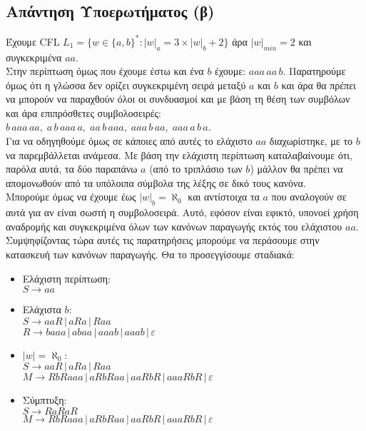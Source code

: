 \subsection{Απάντηση Υποερωτήματος (β)}
\label{ssec:Solution_1.2}
\doublespacing

Έχουμε CFL
$ L_1 = \{w \in \{a, b\}^* : |w|_a = 3 \times |w|_b + 2 \}$
άρα $\vert w \vert_{min} = 2$ και συγκεκριμένα $aa$.\\
Στην περίπτωση όμως που έχουμε έστω και ένα $b$ έχουμε:
$aaa\,aa\,b$.
Παρατηρούμε όμως ότι η γλώσσα δεν ορίζει συγκεκριμένη σειρά μεταξύ $a$ και
$b$ και άρα θα πρέπει να μπορούν να παραχθούν όλοι οι συνδυασμοί και με βάση τη θέση των συμβόλων και άρα
επιπρόσθετες συμβολοσειρές: $b\,aaa\,aa,\; a\,b\,aaa\,a,\; aa\,b\,aaa,\; aaa\,b\,aa,\;
aaa\,a\,b\,a$.\\
Για να οδηγηθούμε όμως σε κάποιες από αυτές το ελάχιστο $aa$ διαχωρίστηκε, με το $b$ να παρεμβάλλεται ανάμεσα.
Με βάση την ελάχιστη περίπτωση καταλαβαίνουμε ότι, παρόλα αυτά, τα δύο παραπάνω $a$ (από το τριπλάσιο των $b$)
μάλλον θα πρέπει να απομονωθούν από τα υπόλοιπα σύμβολα της λέξης σε δικό τους κανόνα.\\
Μπορούμε όμως να έχουμε έως $|w|_b = \aleph_0$ και αντίστοιχα τα $a$ που αναλογούν σε αυτά για αν
είναι σωστή η συμβολοσειρά. Αυτό, εφόσον είναι εφικτό, υπονοεί χρήση αναδρομής και συγκεκριμένα όλων των κανόνων
παραγωγής εκτός του ελάχιστου $aa$.\\
Συμψηφίζοντας τώρα αυτές τις παρατηρήσεις μπορούμε να περάσουμε στην κατασκευή των κανόνων παραγωγής. Θα το
προσεγγίσουμε σταδιακά:
\begin{itemize}
	\itemsep0em

	\item Ελάχιστη περίπτωση:\\
	$S \rightarrow aa$

	\item Ελάχιστα $b$:\\
	$S \rightarrow aaR \,|\, aRa \,|\, Raa$\\
	$R \rightarrow baaa \,|\, abaa \,|\, aaab \,|\, aaab \,|\, \varepsilon$\\

	\item $|w| = \aleph_0$:\\
	$S \rightarrow aaR \,|\, aRa \,|\, Raa$\\
	$M \rightarrow RbRaaa \,|\, aRbRaa \,|\, aaRbR \,|\, aaaRbR \,|\, \varepsilon$\\

	\item Σύμπτυξη:\\
	$S \rightarrow RaRaR$\\
	$M \rightarrow RbRaaa \,|\, aRbRaa \,|\, aaRbR \,|\, aaaRbR \,|\, \varepsilon$\\
\end{itemize}

